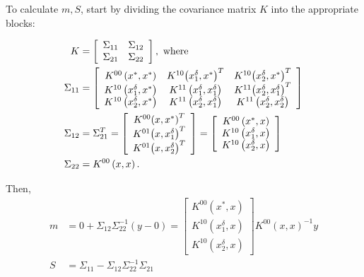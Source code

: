 \documentclass[12pt]{amsart}
\begin{document}
To calculate $m, S$, start by dividing the covariance matrix $K$ into the appropriate blocks:

\begin{align}
K &= \left[ {\begin{array}{*{20}{c}}
{{\Sigma _{11}}}&{{\Sigma _{12}}}\\
{{\Sigma _{21}}}&{{\Sigma _{22}}} 
\end{array}} \right], \rm{\ where} \\
{\Sigma _{11}} &= \left[ {\begin{array}{*{20}{c}}
{{K^{00}}\left( {{x^*},{x^*}} \right)}&{{K^{10}}{{\left( {x_1^\delta ,{x^*}} \right)}^T}}&{{K^{10}}{{\left( {x_2^\delta ,{x^*}} \right)}^T}}\\
{{K^{10}}\left( {x_1^\delta ,{x^*}} \right)}&{{K^{11}}\left( {x_1^\delta ,x_1^\delta } \right)}&{{K^{11}}{{\left( {x_2^\delta ,x_1^\delta } \right)}^T}}\\
{{K^{10}}\left( {x_2^\delta ,{x^*}} \right)}&{{K^{11}}\left( {x_2^\delta ,x_1^\delta } \right)}&{{K^{11}}\left( {x_2^\delta ,x_2^\delta } \right)}
\end{array}} \right]\\
{\Sigma _{12}} &= \Sigma _{21}^T = \left[ {\begin{array}{*{20}{c}}
{{K^{00}}{{\left( {x,{x^*}} \right)}^T}}\\
{{K^{01}}{{\left( {x,x_1^\delta } \right)}^T}}\\
{{K^{01}}{{\left( {x,x_2^\delta } \right)}^T}}
\end{array}} \right] = \left[ {\begin{array}{*{20}{c}}
{{K^{00}}\left( {{x^*},x} \right)}\\
{{K^{10}}\left( {x_1^\delta ,x} \right)}\\
{{K^{10}}\left( {x_2^\delta ,x} \right)}
\end{array}} \right]\\
{\Sigma _{22}} &= {K^{00}}\left( {x,x} \right).
\end{align}

Then,
\begin{align}
m &= 0 + {\Sigma _{12}}\Sigma _{22}^{ - 1}\left( {y - 0} \right) = \left[ {\begin{array}{*{20}{c}}
{{K^{00}}\left( {{x^*},x} \right)}\\
{{K^{10}}\left( {x_1^\delta ,x} \right)}\\
{{K^{10}}\left( {x_2^\delta ,x} \right)}
\end{array}} \right]{K^{00}}{\left( {x,x} \right)^{ - 1}}y\\
S &= {\Sigma _{11}} - {\Sigma _{12}}\Sigma _{22}^{ - 1}{\Sigma _{21}}  
\end{align}
\end{document}
